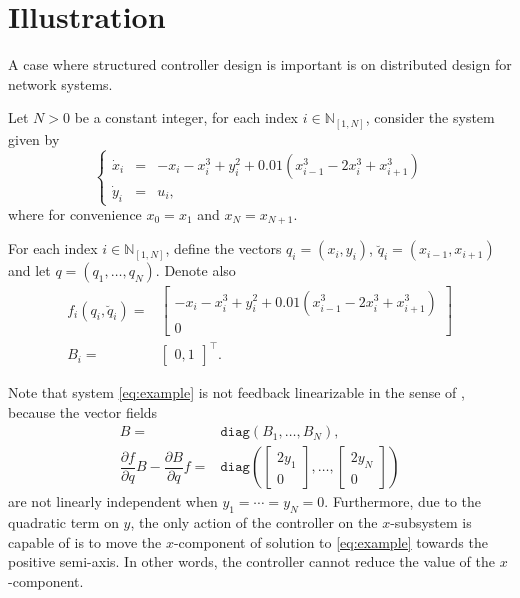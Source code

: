 \documentclass[10pt,twocolumn,twoside]{IEEEtran}
\theoremstyle{plain}
\theoremstyle{definition}
\theoremstyle{remark}
\begin{document}
\section{Illustration}\label{sec:Illustration}

A case where structured controller design is important is on distributed design for network systems.

Let $N>0$ be a constant integer, for each index $i\in\mathbb{N}_{[1,N]}$, consider the system given by
\begin{equation}\label{eq:example}
	\left\{\begin{array}{rcl}
		\dot{x}_i&=&-x_i-x_i^3+y_i^2 + 0.01\left(x_{i-1}^3 - 2x_i^3 +x_{i+1}^3\right)\\
		\dot{y}_i&=&u_i,
	\end{array}\right.
\end{equation}
where for convenience $x_0=x_1$ and $x_N=x_{N+1}$.

For each index $i\in\mathbb{N}_{[1,N]}$, define the vectors $q_i=(x_i,y_i)$, $\breve{q}_i=(x_{i-1},x_{i+1})$ and let $q=(q_1,\ldots,q_N)$. Denote also
\begin{align*}
	f_i(q_i,\breve{q}_i)=&\begin{bmatrix}
		-x_i-x_i^3+y_i^2 + 0.01\left(x_{i-1}^3 - 2x_i^3 +x_{i+1}^3\right)\\
		0
	\end{bmatrix}\\
	B_i=&\begin{bmatrix}
	0, 1
	\end{bmatrix}^\top.
\end{align*}

Note that system \eqref{eq:example} is not feedback linearizable in the sense of \cite{Isidori:1995}, because the vector fields
\begin{align*}
	B=&\mathbin{\mathtt{diag}}(B_1,\ldots,B_N),\\
	\dfrac{\partial f}{\partial q}B-\dfrac{\partial B}{\partial q}f=&\mathbin{\mathtt{diag}}\left(\begin{bmatrix}
	2y_1\\0
	\end{bmatrix},\ldots,\begin{bmatrix}
	2y_N\\0
	\end{bmatrix}\right)
\end{align*}
are not linearly independent when $y_1=\cdots=y_N=0$.  Furthermore, due to the quadratic term on $y$, the only action of the controller on the $x$-subsystem is capable of is to move the $x$-component of solution to \eqref{eq:example} towards the positive semi-axis. In other words, the controller cannot reduce the value of the $x$-component.
\end{document}

